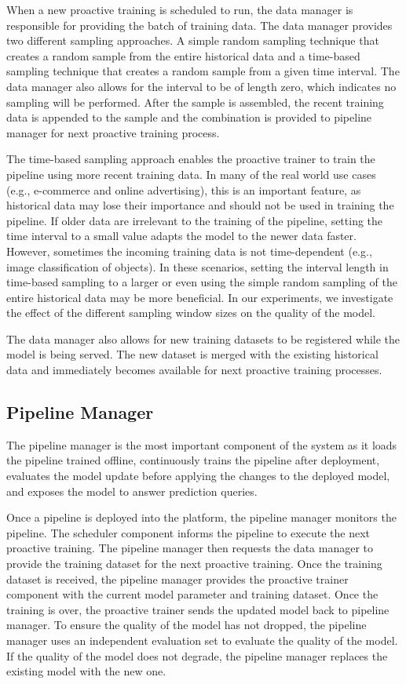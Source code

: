 When a new proactive training is scheduled to run, the data manager is responsible for providing the batch of training data.
The data manager provides two different sampling approaches.
A simple random sampling technique that creates a random sample from the entire historical data and a time-based sampling technique that creates a random sample from a given time interval.
The data manager also allows for the interval to be of length zero, which indicates no sampling will be performed.
After the sample is assembled, the recent training data is appended to the sample and the combination is provided to pipeline manager for next proactive training process.

The time-based sampling approach enables the proactive trainer to train the pipeline using more recent training data.
In many of the real world use cases (e.g., e-commerce and online advertising), this is an important feature, as historical data may lose their importance and should not be used in training the pipeline.
If older data are irrelevant to the training of the pipeline, setting the time interval to a small value adapts the model to the newer data faster.
However, sometimes the incoming training data is not time-dependent (e.g., image classification of objects).
In these scenarios, setting the interval length in time-based sampling to a larger or even using the simple random sampling of the entire historical data may be more beneficial.
In our experiments, we investigate the effect of the different sampling window sizes on the quality of the model.

The data manager also allows for new training datasets to be registered while the model is being served.
The new dataset is merged with the existing historical data and immediately becomes available for next proactive training processes.

\subsection{Pipeline Manager} \label{pipeline-manager} 
The pipeline manager is the most important component of the system as it loads the pipeline trained offline, continuously trains the pipeline after deployment, evaluates the model update before applying the changes to the deployed model, and exposes the model to answer prediction queries.

Once a pipeline is deployed into the platform, the pipeline manager monitors the pipeline.
The scheduler component informs the pipeline to execute the next proactive training.
The pipeline manager then requests the data manager to provide the training dataset for the next proactive training.
Once the training dataset is received, the pipeline manager provides the proactive trainer component with the current model parameter and training dataset.
Once the training is over, the proactive trainer sends the updated model back to pipeline manager.
To ensure the quality of the model has not dropped, the pipeline manager uses an independent evaluation set to evaluate the quality of the model.
If the quality of the model does not degrade, the pipeline manager replaces the existing model with the new one.


